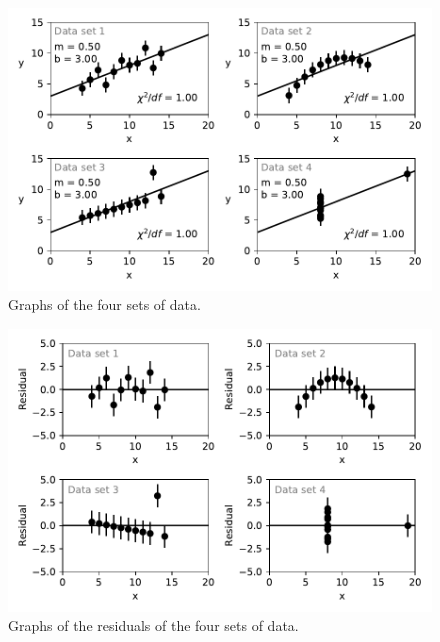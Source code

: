 \documentclass[10pt,aps,prc,twocolumn]{revtex4-1}
\begin{document}
\begin{appendix}
\begin{figure}
\includegraphics[width=\columnwidth]{Figure/SameChi2.pdf}
\caption{Graphs of the four sets of data.}
\label{SameChi2}
\end{figure}

\begin{figure}
\includegraphics[width=\columnwidth]{Figure/SameChi2Residual.pdf}
\caption{Graphs of the residuals of the four sets of data.}
\label{SameChi2}
\end{figure}
\end{appendix}



\end{document}
